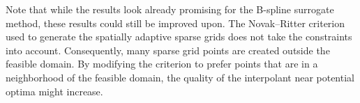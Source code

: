 Note that while the results look already promising for the B-spline surrogate
method, these results could still be improved upon.
The Novak--Ritter criterion used to generate the
spatially adaptive sparse grids does not take the constraints into account.
Consequently, many sparse grid points are created outside the feasible domain.
By modifying the criterion to prefer points that are in a neighborhood of
the feasible domain, the quality of the interpolant near potential optima
might increase.
